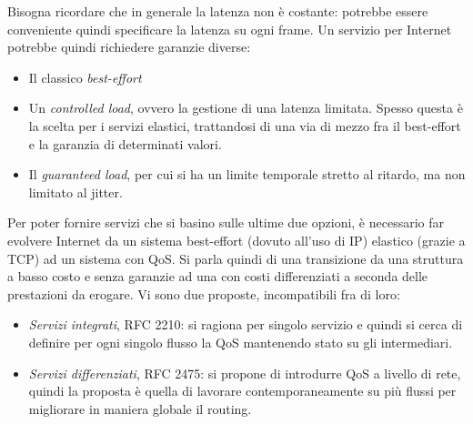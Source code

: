 Bisogna ricordare che in generale la latenza non è costante: potrebbe essere conveniente quindi specificare la latenza su ogni frame. Un servizio per Internet potrebbe quindi richiedere garanzie diverse:
\begin{itemize}
 \item Il classico \textit{best-effort}
 \item Un \textit{controlled load}, ovvero la gestione di una latenza limitata. Spesso questa è la scelta per i
 servizi elastici, trattandosi di una via di mezzo fra il best-effort e la garanzia di determinati valori.
 \item Il \textit{guaranteed load}, per cui si ha un limite temporale stretto al ritardo, ma non limitato al jitter.
\end{itemize}
Per poter fornire servizi che si basino sulle ultime due opzioni, è necessario far evolvere Internet da un sistema
best-effort (dovuto all'uso di IP) elastico (grazie a TCP) ad un sistema con QoS. Si parla quindi di una transizione
da una struttura a basso costo e senza garanzie ad una con costi differenziati a seconda delle prestazioni da erogare.
Vi sono due proposte, incompatibili fra di loro:
\begin{itemize}
 \item \textit{Servizi integrati}, RFC 2210: si ragiona per singolo servizio e quindi si cerca di definire per ogni
 singolo flusso la QoS mantenendo stato su gli intermediari.
 \item \textit{Servizi differenziati}, RFC 2475: si propone di introdurre QoS a livello di rete, quindi la proposta è
 quella di lavorare contemporaneamente su più flussi per migliorare in maniera globale il routing.
\end{itemize}


